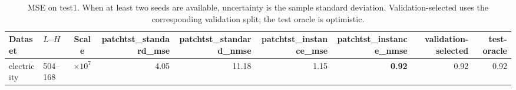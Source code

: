 \begin{table}[htbp]
\centering
\caption{MSE on test1. When at least two seeds are available, uncertainty is the sample standard deviation. Validation-selected uses the corresponding validation split; the test oracle is optimistic.}
\begin{tabular}{llcrrrrr|r}
\toprule
Dataset & $L$--$H$ & Scale & patchtst\_standard\_mse & patchtst\_standard\_nmse & patchtst\_instance\_mse & patchtst\_instance\_nmse & validation-selected & test-oracle \\
\midrule
electricity & 504--168 & $\times 10^{7}$ & 4.05 & 11.18 & 1.15 & \textbf{0.92} & 0.92 & 0.92 \\
\bottomrule
\end{tabular}
\end{table}
